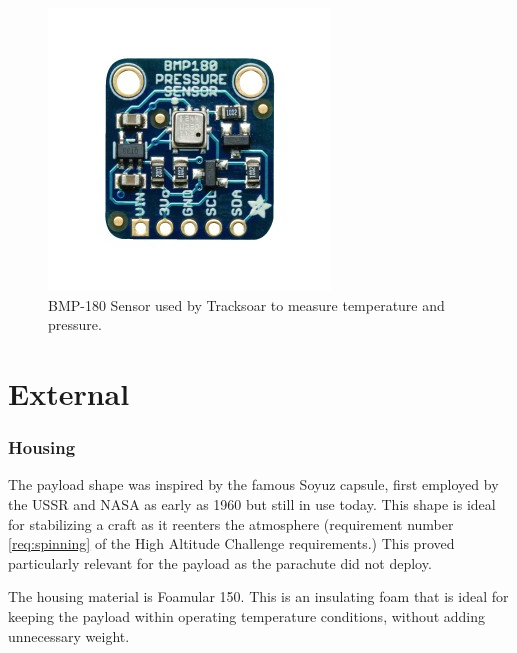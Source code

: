 \documentclass[english]{report}
\begin{document}
\begin{figure}[H]
\begin{centering}
\includegraphics{./images/bmp}
\par\end{centering}
\caption{BMP-180 Sensor used by Tracksoar to measure temperature and pressure.}
\end{figure}



\part{External}
\label{part:external}

\section{Housing}

The payload shape was inspired by the famous Soyuz capsule, first employed by the USSR and NASA as early as 1960 but still in use today.  This shape is ideal for stabilizing a craft as it reenters the atmosphere (requirement number \ref{req:spinning} of the High Altitude Challenge requirements.)  This proved particularly relevant for the payload as the parachute did not deploy.

The housing material is Foamular 150.  This is an insulating foam that is ideal for keeping the payload within operating temperature conditions, without adding unnecessary weight.
\end{document}

